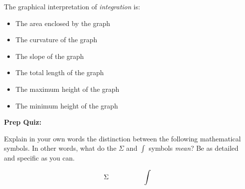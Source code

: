 The graphical interpretation of {\it integration} is:

\begin{itemize}
\item{} The area enclosed by the graph
\vskip 5pt 
\item{} The curvature of the graph
\vskip 5pt 
\item{} The slope of the graph
\vskip 5pt 
\item{} The total length of the graph
\vskip 5pt 
\item{} The maximum height of the graph
\vskip 5pt 
\item{} The minimum height of the graph
\end{itemize}






\vfil \eject

\noindent
{\bf Prep Quiz:}

Explain in your own words the distinction between the following mathematical symbols.  In other words, what do the $\Sigma$ and $\int$ symbols {\it mean}?  Be as detailed and specific as you can.

$$\Sigma \hskip 50pt \int$$





